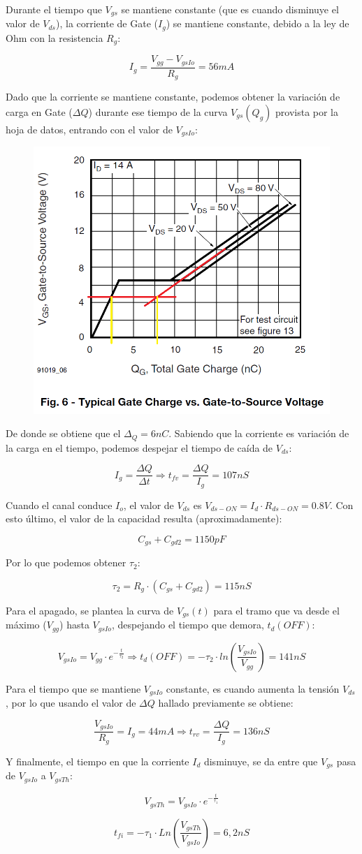 \documentclass[e4_tp1_main.tex]{subfiles}
\begin{document}
Durante el tiempo que $V_{gs}$ se mantiene constante (que es cuando disminuye el valor de $V_{ds}$), la corriente de Gate ($I_g$) se mantiene constante, debido a la ley de Ohm con la resistencia $R_g$:

\[
I_g = \frac{V_{gg} - V_{gsIo}}{R_g} = 56mA
\] 

Dado que la corriente se mantiene constante, podemos obtener la variación de carga en Gate ($\Delta Q$) durante ese tiempo de la curva $V_{gs}(Q_g)$ provista por la hoja de datos, entrando con el valor de $V_{gsIo}$:

\begin{figure}[H]
\centering
\includegraphics[width=0.5\linewidth]{Images/Ej1-GateCharge.png}
\end{figure}

De donde se obtiene que el $\Delta_Q = 6nC$. Sabiendo que la corriente es variación de la carga en el tiempo, podemos despejar el tiempo de caída de $V_{ds}$:

\[
I_g = \frac{\Delta Q}{\Delta t} \Longrightarrow t_{fv} = \frac{\Delta Q}{I_g} = 107nS
\]

Cuando el canal conduce $I_o$, el valor de $V_{ds}$ es $V_{ds-ON} = I_d \cdot R_{ds-ON} = 0.8V$. Con esto último, el valor de la capacidad resulta (aproximadamente):

\[
C_{gs} + C_{gd2} = 1150pF
\]

Por lo que podemos obtener $\tau_2$:

\[
\tau_2 = R_g \cdot (C_{gs} + C_{gd2}) = 115nS
\]

Para el apagado, se plantea la curva de $V_{gs}(t)$ para el tramo que va desde el máximo ($V_{gg}$) hasta $V_{gsIo}$, despejando el tiempo que demora, $t_d(OFF)$:

\[
V_{gsIo} = V_{gg} \cdot e^{-\frac{t}{\tau_2}} \Longrightarrow t_d(OFF) = -\tau_2 \cdot ln\left( \frac{V_{gsIo}}{V_{gg}} \right) = 141nS
\]

Para el tiempo que se mantiene $V_{gsIo}$ constante, es cuando aumenta la tensión $V_{ds}$, por lo que usando el valor de $\Delta Q$ hallado previamente se obtiene:

\[
\frac{V_{gsIo}}{R_g} = I_g = 44mA \Longrightarrow t_{rv} = \frac{\Delta Q}{I_g} = 136nS
\]

Y finalmente, el tiempo en que la corriente $I_d$ disminuye, se da entre que $V_{gs}$ pasa de $V_{gsIo}$ a $V_{gsTh}$:

\[
V_{gsTh} = V_{gsIo} \cdot e^{-\frac{t}{\tau_1}}
\]

\[
t_{fi} = -\tau_1 \cdot Ln \left( \frac{V_{gsTh}}{V_{gsIo}}\right) = 6,2nS
\]
 
\newpage
\end{document}
